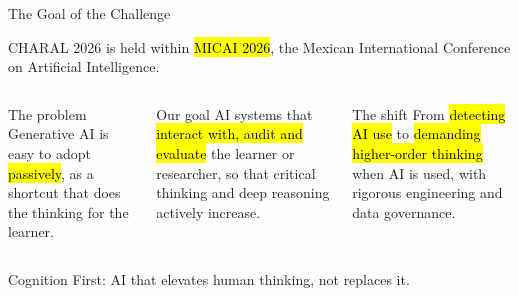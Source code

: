 \begin{frame}{The Goal of the Challenge}
  \begin{center}
    {\small\color{charalMuted}CHARAL 2026 is held within \hl{MICAI 2026}, the Mexican International Conference
    on Artificial Intelligence.}
  \end{center}
  \vspace{1mm}
  \begin{columns}[T, onlytextwidth]
    \begin{charalcard}{The problem}
      Generative AI is easy to adopt \hl{passively}, as a shortcut that does the thinking for the learner.
    \end{charalcard}
    \begin{charalcard}{Our goal}
      AI systems that \hl{interact with, audit and evaluate} the learner or researcher, so that critical
      thinking and deep reasoning actively increase.
    \end{charalcard}
    \begin{charalcard}{The shift}
      From \hl{detecting AI use} to \hl{demanding higher-order thinking} when AI is used, with rigorous
      engineering and data governance.
    \end{charalcard}
  \end{columns}
  \vspace{4mm}
  \begin{center}
    {\headingfont\normalsize\color{white}Cognition First: AI that elevates human thinking, not replaces it.}
  \end{center}
\end{frame}
